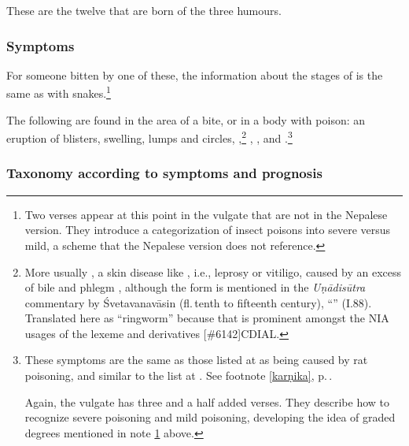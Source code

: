 \begin{translation}
\item[17ab]

These are the twelve that are born of the three humours.

\subsubsection{Symptoms}

\item[17cd] 

For someone bitten by one of these, the information about the stages
of  is the same as with snakes.\footnote{Two
    verses appear at this point in the vulgate that are not in the
    Nepalese version.  They introduce a categorization of insect poisons
    into severe versus mild, a scheme that the Nepalese version does not
    reference.\label{gradation}}

\item[20--21ab, 21.add-1] 

The following are found in the area of a bite, or in a body
 with poison: an eruption of blisters, swelling,
lumps and circles, ,\footnote{More usually
    , a skin disease like , i.e., leprosy or
    vitiligo, caused by an excess of bile and phlegm
    \citep[390]{josi-maha}, although the form  is mentioned in
    the \emph{Uṇādisūtra} commentary by Śvetavanavāsin (fl.\,tenth to
    fifteenth century), “” (I.88). Translated
    here as “ringworm” because that is prominent amongst the NIA usages of
    the lexeme and derivatives
    [\#6142]{CDIAL}.} %
, ,
and .\footnote{These symptoms
    are the same as those listed at  as being caused by rat
    poisoning, and similar to the list at .  See footnote
    \ref{karṇika}, p.\,\pageref{karṇika}.
    
    Again, the vulgate has three and a half added verses.  They describe how to 
    recognize severe poisoning and mild poisoning, developing the idea of graded 
    degrees mentioned in note \ref{gradation} above.}
    

    

\subsubsection{Taxonomy according to symptoms and prognosis}


\end{translation}
